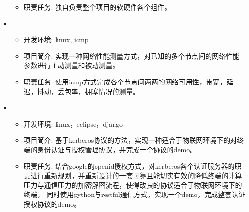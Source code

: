 \begin{itemize}[leftmargin=*]
{\begin{itemize}
        \item 职责任务: 独自负责整个项目的软硬件各个组件。
      \end{itemize}
      }
    \item
    {\small
    \begin{itemize}
      \item 开发环境: linux, icmp
      \item 项目简介: 实现一种网络性能测量方式，对已知的多个节点间的网络性能参数进行主动测量和被动测量。
      \item 职责任务: 使用icmp方式完成各个节点间两两的网络可用性，带宽，延迟，抖动，丢包率，拥塞情况的测量。
    \end{itemize}
    }
    \item
    {\small
    \begin{itemize}
      \item 开发环境: linux，eclipse，django
      \item 项目简介: 基于kerberos协议的方法，实现一种适合于物联网环境下的对终端的身份认证与授权管理协议，并完成一个协议的demo。
      \item 职责任务: 结合google的openid授权方式，对kerberos各个认证服务器的职责进行重新规划，并重新设计的一套可靠且能切实有效的降低终端的计算压力与通信压力的加密解密流程，使得改良的协议适合于物联网环境下的终端。 同时使用python与restful通信方式，实现一个demo，完成整套认证授权协议的demo。
    \end{itemize}
    }
  \end{itemize}